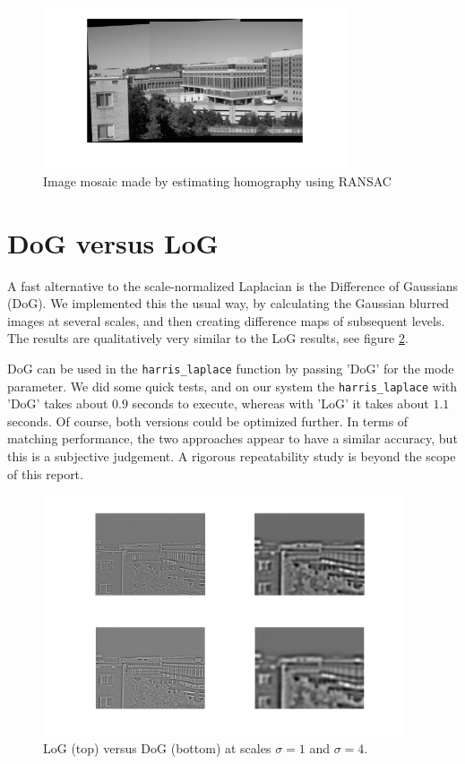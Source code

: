 \documentclass[a4paper,10pt]{article}
\begin{document}
\begin{figure}[h!t]
\centering
\includegraphics[width=0.8\textwidth]{img/mosaic}
\caption{Image mosaic made by estimating homography using RANSAC}
\label{fig:mosaic}
\end{figure}

\section{DoG versus LoG}
A fast alternative to the scale-normalized Laplacian is the Difference of Gaussians (DoG).
We implemented this the usual way, by calculating the Gaussian blurred images at several scales, and then creating difference maps of subsequent levels.
The results are qualitatively very similar to the LoG results, see figure \ref{fig:logdog}.

DoG can be used in the \verb+harris_laplace+ function by passing 'DoG' for the mode parameter.
We did some quick tests, and on our system the \verb+harris_laplace+ with 'DoG' takes about $0.9$ seconds to execute, whereas with 'LoG' it takes about $1.1$ seconds.
Of course, both versions could be optimized further.
In terms of matching performance, the two approaches appear to have a similar accuracy, but this is a subjective judgement.
A rigorous repeatability study is beyond the scope of this report.

\begin{figure}[h!t]
\centering
\includegraphics[width=0.95\textwidth]{img/LOG_DOG}
\caption{LoG (top) versus DoG (bottom) at scales $\sigma = 1$ and $\sigma = 4$.}
\label{fig:logdog}
\end{figure}



\end{document}
